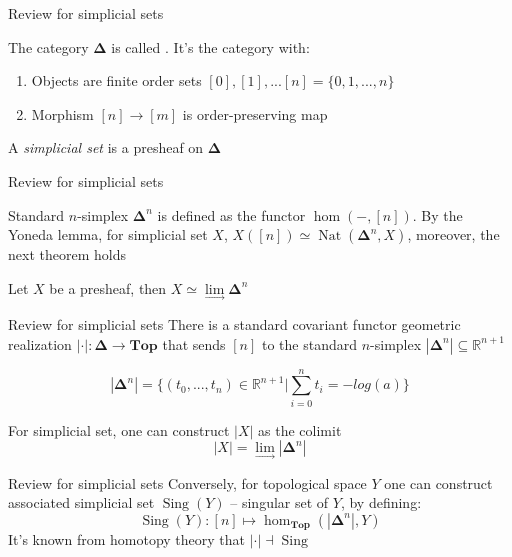 \documentclass{beamer}
\DeclareMathOperator{\Sing}{Sing}
\DeclareMathOperator{\Nat}{Nat}
\theoremstyle{named}
\begin{document}
\begin{frame}{Review for simplicial sets}
	\begin{definition}
		The category $\pmb{\Delta}$ is called . It's the category with:
		\begin{enumerate}
			\item Objects are finite order sets $[0], [1], ... [n] = \{ 0, 1, ..., n \}$
			\item Morphism $[n] \to [m]$ is order-preserving map
		\end{enumerate}
	\end{definition}
	\begin{definition}
	A {\it simplicial set} is a presheaf on $\pmb{\Delta}$
\end{definition}
\end{frame}

\begin{frame}{Review for simplicial sets}
	
	Standard $n$-simplex $\mathbf{\Delta}^n$ is defined as the functor $\hom(-,[n])$. By the Yoneda lemma, for simplicial set $X$, $X([n]) \simeq \Nat(\mathbf{\Delta}^n, X)$, moreover, the next theorem holds
	
	\begin{theorem}
		Let $X$ be a presheaf, then $X \simeq \lim\limits_{\to}\mathbf{\Delta}^n $ 
	\end{theorem}
\end{frame}

\begin{frame}{Review for simplicial sets}
	There is a standard covariant functor geometric realization $ |\cdot| : \pmb{\Delta} \to \pmb{Top}$ that sends $[n]$ to the standard $n$-simplex $|\mathbf{\Delta}^n| \subseteq \mathbb{R}^{n+1}$
	
	\[
			|\mathbf{\Delta}^n| = \{ (t_0, ..., t_n) \in \mathbb{R}^{n+1} | \sum\limits_{i=0}^{n} t_i = -log(a) \}
	\]
	
	For simplicial set, one can construct $|X|$ as the colimit 
	\[
		|X| = \lim\limits_{\to} |\mathbf{\Delta}^n|
	\]
\end{frame}

\begin{frame}{Review for simplicial sets}
	Conversely, for topological space $Y$ one can construct associated simplicial set $\Sing(Y)$ -- singular set of $Y$, by defining:
	\[
		\Sing(Y): [n] \mapsto \hom_{\pmb{Top}}(|\mathbf{\Delta}^n|, Y)
	\]
	It's known from homotopy theory that $|\cdot| \dashv \Sing$
\end{frame}
\end{document}
